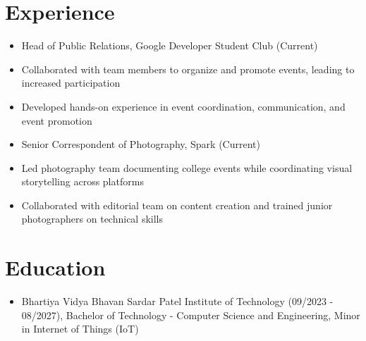\documentclass[10pt]{article}
\begin{document}
\section*{Experience}
\vspace{0.05cm}
\begin{itemize}[leftmargin=0.5cm, itemsep=2pt]

  \item Head of Public Relations, Google Developer Student Club (Current)

  \item Collaborated with team members to organize and promote events, leading to increased participation

  \item Developed hands-on experience in event coordination, communication, and event promotion

  \item Senior Correspondent of Photography, Spark (Current)

  \item Led photography team documenting college events while coordinating visual storytelling across platforms

  \item Collaborated with editorial team on content creation and trained junior photographers on technical skills

\end{itemize}



\section*{Education}
\vspace{0.05cm}
\begin{itemize}[leftmargin=0.5cm, itemsep=2pt]

  \item Bhartiya Vidya Bhavan Sardar Patel Institute of Technology (09/2023 - 08/2027), Bachelor of Technology - Computer Science and Engineering, Minor in Internet of Things (IoT)

\end{itemize}
\end{document}
